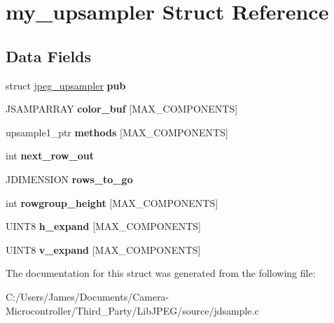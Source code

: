 \hypertarget{structmy__upsampler}{}\section{my\+\_\+upsampler Struct Reference}
\label{structmy__upsampler}
\subsection*{Data Fields}
\begin{DoxyCompactItemize}
\item 
\mbox{\label{structmy__upsampler_a960fa2c9af532f37dc366f1cdbdd0fd8}} 
struct \hyperlink{structjpeg__upsampler}{jpeg\+\_\+upsampler} {\bfseries pub}
\item 
\mbox{\label{structmy__upsampler_a284ba5e2fbe7ec20d62f721872027b8c}} 
J\+S\+A\+M\+P\+A\+R\+R\+AY {\bfseries color\+\_\+buf} \mbox{[}M\+A\+X\+\_\+\+C\+O\+M\+P\+O\+N\+E\+N\+TS\mbox{]}
\item 
\mbox{\label{structmy__upsampler_a1a359bedacd1ce80c2c76caa7e78b5a0}} 
upsample1\+\_\+ptr {\bfseries methods} \mbox{[}M\+A\+X\+\_\+\+C\+O\+M\+P\+O\+N\+E\+N\+TS\mbox{]}
\item 
\mbox{\label{structmy__upsampler_a05bca7a992f05106d08f9235a046993d}} 
int {\bfseries next\+\_\+row\+\_\+out}
\item 
\mbox{\label{structmy__upsampler_abaf5c475b6fbde86c13ba21a1b31592b}} 
J\+D\+I\+M\+E\+N\+S\+I\+ON {\bfseries rows\+\_\+to\+\_\+go}
\item 
\mbox{\label{structmy__upsampler_a7507e89d319f0c5754990bbd089158a6}} 
int {\bfseries rowgroup\+\_\+height} \mbox{[}M\+A\+X\+\_\+\+C\+O\+M\+P\+O\+N\+E\+N\+TS\mbox{]}
\item 
\mbox{\label{structmy__upsampler_a02f93051387de0a3e536dfc8d58f33a3}} 
U\+I\+N\+T8 {\bfseries h\+\_\+expand} \mbox{[}M\+A\+X\+\_\+\+C\+O\+M\+P\+O\+N\+E\+N\+TS\mbox{]}
\item 
\mbox{\label{structmy__upsampler_ad25fd6460bdc4796d0d3f6832187f51f}} 
U\+I\+N\+T8 {\bfseries v\+\_\+expand} \mbox{[}M\+A\+X\+\_\+\+C\+O\+M\+P\+O\+N\+E\+N\+TS\mbox{]}
\end{DoxyCompactItemize}


The documentation for this struct was generated from the following file\+:\begin{DoxyCompactItemize}
\item 
C\+:/\+Users/\+James/\+Documents/\+Camera-\/\+Microcontroller/\+Third\+\_\+\+Party/\+Lib\+J\+P\+E\+G/source/jdsample.\+c\end{DoxyCompactItemize}
